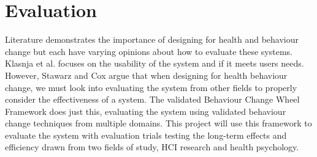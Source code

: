 
\newpage
\section{Evaluation}

Literature demonstrates the importance of designing for health and behaviour change \cite{article_mhealth, article_designing_for_healthy_lifestyles, article_designing_for_health_behaviour_change_hci} but each have varying opinions about how to evaluate these systems. Klasnja et al. \cite{article_evaluate_tech_health_behaviour_change} focuses on the usability of the system and if it meets users needs. However, Stawarz and Cox \cite{article_designing_for_health_behaviour_change_hci} argue that when designing for health behaviour change, we must look into evaluating the system from other fields to properly consider the effectiveness of a system. The validated Behaviour Change Wheel Framework \cite{article_behaviour_change_wheel} does just this, evaluating the system using validated behaviour change techniques from multiple domains. This project will use this framework to evaluate the system with evaluation trials testing the long-term effects and efficiency drawn from two fields of study, HCI research and health psychology.


